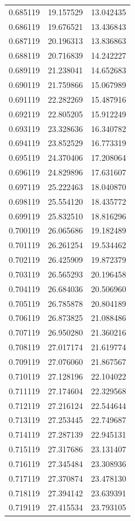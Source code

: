 \begin{tabular}{rrr}
0.685119 & 19.157529 & 13.042435 \\
0.686119 & 19.676521 & 13.436843 \\
0.687119 & 20.196313 & 13.836863 \\
0.688119 & 20.716839 & 14.242227 \\
0.689119 & 21.238041 & 14.652683 \\
0.690119 & 21.759866 & 15.067989 \\
0.691119 & 22.282269 & 15.487916 \\
0.692119 & 22.805205 & 15.912249 \\
0.693119 & 23.328636 & 16.340782 \\
0.694119 & 23.852529 & 16.773319 \\
0.695119 & 24.370406 & 17.208064 \\
0.696119 & 24.829896 & 17.631607 \\
0.697119 & 25.222463 & 18.040870 \\
0.698119 & 25.554120 & 18.435772 \\
0.699119 & 25.832510 & 18.816296 \\
0.700119 & 26.065686 & 19.182489 \\
0.701119 & 26.261254 & 19.534462 \\
0.702119 & 26.425909 & 19.872379 \\
0.703119 & 26.565293 & 20.196458 \\
0.704119 & 26.684036 & 20.506960 \\
0.705119 & 26.785878 & 20.804189 \\
0.706119 & 26.873825 & 21.088486 \\
0.707119 & 26.950280 & 21.360216 \\
0.708119 & 27.017174 & 21.619774 \\
0.709119 & 27.076060 & 21.867567 \\
0.710119 & 27.128196 & 22.104022 \\
0.711119 & 27.174604 & 22.329568 \\
0.712119 & 27.216124 & 22.544644 \\
0.713119 & 27.253445 & 22.749687 \\
0.714119 & 27.287139 & 22.945131 \\
0.715119 & 27.317686 & 23.131407 \\
0.716119 & 27.345484 & 23.308936 \\
0.717119 & 27.370874 & 23.478130 \\
0.718119 & 27.394142 & 23.639391 \\
0.719119 & 27.415534 & 23.793105 \\

\end{tabular}
